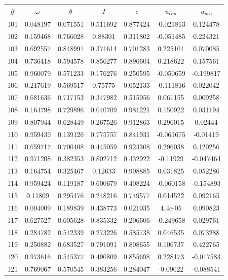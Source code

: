 \newpage
\begin{table}
\begin{tabular}{c|c|c|c|c|c|c}
\# & $\omega$ & $\theta$ & $I$ & $\epsilon$ & $u_{con}$ & $u_{pro}$\\
\hline
101 & 0.048197 & 0.071551 & 0.511692 & 0.877424 & -0.021813 & 0.124478\\
102 & 0.159468 & 0.766028 & 0.88301 & 0.311802 & -0.051485 & 0.224321\\
103 & 0.692557 & 0.848991 & 0.371614 & 0.701283 & 0.225104 & 0.070085\\
104 & 0.736418 & 0.594578 & 0.856277 & 0.896604 & 0.218622 & 0.157561\\
105 & 0.960079 & 0.571233 & 0.176276 & 0.250595 & -0.050659 & -0.199817\\
106 & 0.217619 & 0.569517 & 0.75775 & 0.052133 & -0.111836 & 0.022042\\
107 & 0.681636 & 0.717153 & 0.347982 & 0.515056 & 0.061155 & 0.009258\\
108 & 0.164798 & 0.729896 & 0.040709 & 0.981221 & 0.150922 & 0.031194\\
109 & 0.807944 & 0.628449 & 0.267526 & 0.912863 & 0.296015 & 0.02444\\
110 & 0.959439 & 0.139126 & 0.775757 & 0.841931 & -0.061675 & -0.01419\\
111 & 0.659717 & 0.700408 & 0.445059 & 0.924308 & 0.296038 & 0.120256\\
112 & 0.971208 & 0.382353 & 0.802712 & 0.432922 & -0.11929 & -0.047464\\
113 & 0.164754 & 0.325467 & 0.12633 & 0.908885 & 0.031825 & 0.052286\\
114 & 0.959424 & 0.119187 & 0.600679 & 0.408224 & -0.060158 & -0.154893\\
115 & 0.11809 & 0.295476 & 0.248216 & 0.749577 & 0.014522 & 0.092165\\
116 & 0.004009 & 0.189839 & 0.438773 & 0.021035 & 4.4e-05 & 0.090823\\
117 & 0.627527 & 0.605628 & 0.835332 & 0.206606 & -0.249658 & 0.029761\\
118 & 0.284782 & 0.542339 & 0.273226 & 0.585738 & 0.046535 & 0.073288\\
119 & 0.250882 & 0.683527 & 0.791091 & 0.808655 & 0.106737 & 0.422765\\
120 & 0.973616 & 0.545377 & 0.490809 & 0.855698 & 0.228173 & -0.017583\\
121 & 0.769067 & 0.570545 & 0.383256 & 0.284047 & -0.09022 & -0.088541\\

\end{tabular}
\end{table}
